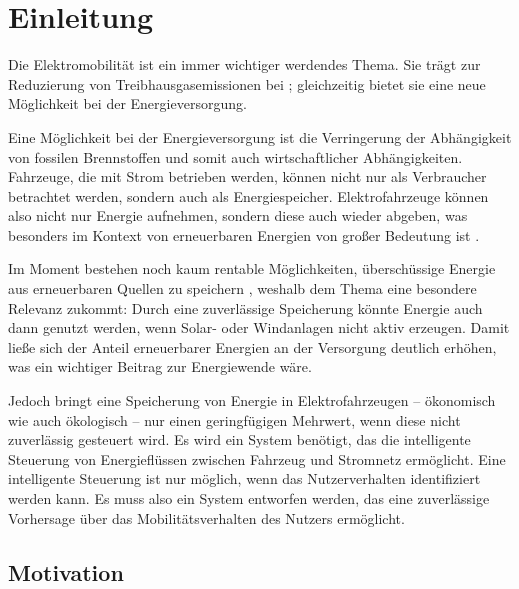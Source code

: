 \chapter{Einleitung}
\label{ch:einleitung}

Die Elektromobilität ist ein immer wichtiger werdendes Thema. Sie trägt zur Reduzierung von Treibhausgasemissionen bei \parencite{knobloch2020net,ipcc2022transport}; gleichzeitig bietet sie eine neue Möglichkeit bei der Energieversorgung.

Eine Möglichkeit bei der Energieversorgung ist die Verringerung der Abhängigkeit von fossilen Brennstoffen und somit auch wirtschaftlicher Abhängigkeiten. Fahrzeuge, die mit Strom betrieben werden, können nicht nur als Verbraucher betrachtet werden, sondern auch als Energiespeicher. Elektrofahrzeuge können also nicht nur Energie aufnehmen, sondern diese auch wieder abgeben, was besonders im Kontext von erneuerbaren Energien von großer Bedeutung ist \parencite{kempton2005v2g}.

Im Moment bestehen noch kaum rentable Möglichkeiten, überschüssige Energie aus erneuerbaren Quellen zu speichern \parencite{schmidt2019projecting,zerrahn2017longrun}, weshalb dem Thema eine besondere Relevanz zukommt: Durch eine zuverlässige Speicherung könnte Energie auch dann genutzt werden, wenn Solar- oder Windanlagen nicht aktiv erzeugen. Damit ließe sich der Anteil erneuerbarer Energien an der Versorgung deutlich erhöhen, was ein wichtiger Beitrag zur Energiewende wäre.

Jedoch bringt eine Speicherung von Energie in Elektrofahrzeugen -- ökonomisch wie auch ökologisch -- nur einen geringfügigen Mehrwert, wenn diese nicht zuverlässig gesteuert wird. Es wird ein System benötigt, das die intelligente Steuerung von Energieflüssen zwischen Fahrzeug und Stromnetz ermöglicht. Eine intelligente Steuerung ist nur möglich, wenn das Nutzerverhalten identifiziert werden kann. Es muss also ein System entworfen werden, das eine zuverlässige Vorhersage über das Mobilitätsverhalten des Nutzers ermöglicht.

\section{Motivation}
\label{sec:motivation}

